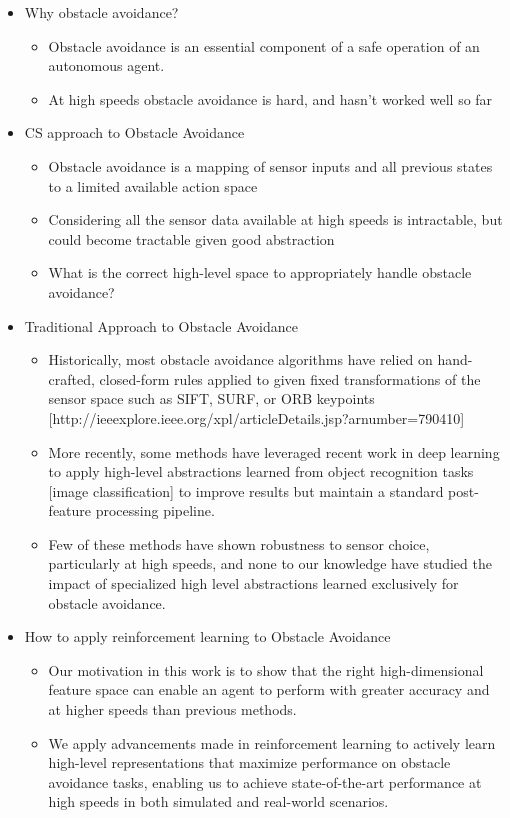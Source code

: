 \documentclass[paper=a4, fontsize=11pt]{scrartcl} %
\begin{document}
\begin{itemize}
	\item Why obstacle avoidance?
	\begin{itemize}
		\item Obstacle avoidance is an essential component of a safe operation of an autonomous agent.
		\item At high speeds obstacle avoidance is hard, and hasn't worked well so far
	\end{itemize}

	\item CS approach to Obstacle Avoidance
	\begin{itemize}
		\item Obstacle avoidance is a mapping of sensor inputs and all previous states to a limited available action space
		\item Considering all the sensor data available at high speeds is intractable, but could become tractable given good abstraction
		\item What is the correct high-level space to appropriately handle obstacle avoidance?
	\end{itemize}
		
	\item Traditional Approach to Obstacle Avoidance
	\begin{itemize}
		\item Historically, most obstacle avoidance algorithms have relied on hand-crafted, closed-form rules applied to given fixed transformations of the sensor space such as SIFT, SURF, or ORB keypoints [http://ieeexplore.ieee.org/xpl/articleDetails.jsp?arnumber=790410]
		\item More recently, some methods have leveraged recent work in deep learning to apply high-level abstractions learned from object recognition tasks [image classification] to improve results but maintain a standard post-feature processing pipeline.
		\item Few of these methods have shown robustness to sensor choice, particularly at high speeds, and none to our knowledge have studied the impact of specialized high level abstractions learned exclusively for obstacle avoidance.
	\end{itemize}

	\item How to apply reinforcement learning to Obstacle Avoidance
	\begin{itemize}	
		\item Our motivation in this work is to show that the right high-dimensional feature space can enable an agent to perform with greater accuracy and at higher speeds than previous methods.
		\item We apply advancements made in reinforcement learning to actively learn high-level representations that maximize performance on obstacle avoidance tasks, enabling us to achieve state-of-the-art performance at high speeds in both simulated and real-world scenarios. 
	\end{itemize}


\end{itemize}
\end{document}
